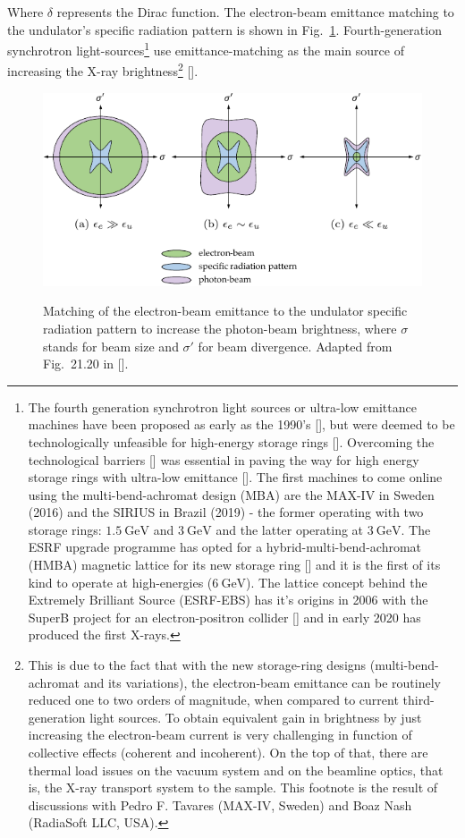 \begin{refsection}
Where $\delta$ represents the Dirac function. The electron-beam emittance matching to the undulator's specific radiation pattern is shown in Fig.~\ref{fig:matching}. Fourth-generation synchrotron light-sources\footnote{The fourth generation synchrotron light sources or ultra-low emittance machines have been proposed as early as the 1990's [\cite{Einfeld1996, Einfeld2014}], but were deemed to be technologically unfeasible for high-energy storage rings [\cite{Ropert2000, Elleaume2003}]. Overcoming the technological barriers [\cite{Borland2014}] was essential in paving the way for high energy storage rings with ultra-low emittance [\cite{Bei2010, Eriksson2016}]. The first machines to come online using the multi-bend-achromat design (MBA) are the MAX-IV in Sweden (2016) and the SIRIUS in Brazil (2019) - the former operating with two storage rings: $1.5~\mathrm{GeV}$ and $3~\mathrm{GeV}$ and the latter operating at $3~\mathrm{GeV}$. The ESRF upgrade programme has opted for a hybrid-multi-bend-achromat (HMBA) magnetic lattice for its new storage ring [\cite{Biasci2014}] and it is the first of its kind to operate at high-energies ($6~\mathrm{GeV}$). The lattice concept behind the Extremely Brilliant Source (ESRF-EBS) has it's origins in 2006 with the SuperB project for an electron-positron collider [\cite{Raimondi2017}] and in early 2020 has produced the first X-rays.} use emittance-matching as the main source of increasing the X-ray brightness\footnote{This is due to the fact that with the new storage-ring designs (multi-bend-achromat and its variations), the electron-beam emittance can be routinely reduced one to two orders of magnitude, when compared to current third-generation light sources. To obtain equivalent gain in brightness by just increasing the electron-beam current is very challenging in function of collective effects (coherent and incoherent). On the top of that, there are thermal load issues on the vacuum system and on the beamline optics, that is, the X-ray transport system to the sample. This footnote is the result of discussions with Pedro F. Tavares (MAX-IV, Sweden)  and Boaz Nash (RadiaSoft LLC, USA).} [\cite[\textit{§21.8.1}]{Wiedemann2015}].

\begin{figure}[t]
    \centering
    {\includegraphics[width=.6\linewidth]{figures/ch02/emittance.pdf}}
    \caption[Emittance matching]{Matching of the electron-beam emittance to the undulator specific radiation pattern to increase the photon-beam brightness, where $\sigma$ stands for beam size and $\sigma'$ for beam divergence. Adapted from Fig.~21.20 in [\cite{Wiedemann2015}].}
    \label{fig:matching}
\end{figure}


\end{refsection}
